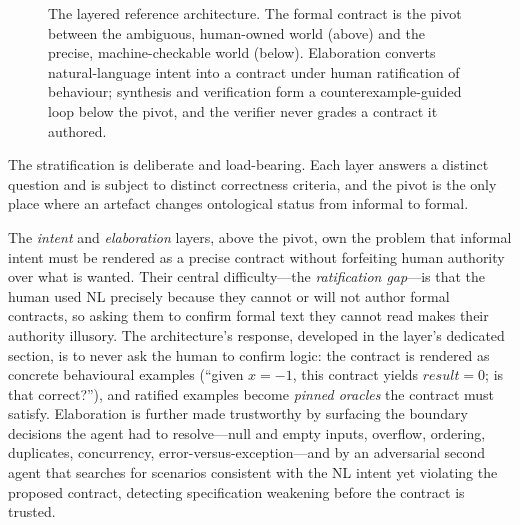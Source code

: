 \begin{figure}[t]
  \caption{The layered reference architecture. The formal contract is the pivot between the ambiguous, human-owned world (above) and the precise, machine-checkable world (below). Elaboration converts natural-language intent into a contract under human ratification of behaviour; synthesis and verification form a counterexample-guided loop below the pivot, and the verifier never grades a contract it authored.}
  \label{fig:layers}
\end{figure}

The stratification is deliberate and load-bearing. Each layer answers a distinct question and is subject to distinct correctness criteria, and the pivot is the only place where an artefact changes ontological status from informal to formal.

The \emph{intent} and \emph{elaboration} layers, above the pivot, own the problem that informal intent must be rendered as a precise contract without forfeiting human authority over what is wanted. Their central difficulty---the \emph{ratification gap}---is that the human used NL precisely because they cannot or will not author formal contracts, so asking them to confirm formal text they cannot read makes their authority illusory. The architecture's response, developed in the layer's dedicated section, is to never ask the human to confirm logic: the contract is rendered as concrete behavioural examples (``given $x=-1$, this contract yields $\mathit{result}=0$; is that correct?''), and ratified examples become \emph{pinned oracles} the contract must satisfy. Elaboration is further made trustworthy by surfacing the boundary decisions the agent had to resolve---null and empty inputs, overflow, ordering, duplicates, concurrency, error-versus-exception---and by an adversarial second agent that searches for scenarios consistent with the NL intent yet violating the proposed contract, detecting specification weakening before the contract is trusted.

